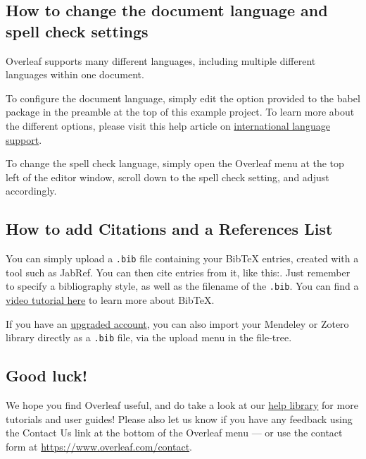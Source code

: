 \subsection{How to change the document language and spell check settings}

Overleaf supports many different languages, including multiple different languages within one document. 

To configure the document language, simply edit the option provided to the babel package in the preamble at the top of this example project. To learn more about the different options, please visit this help article on \href{https://www.overleaf.com/learn/latex/International_language_support}{international language support}.

To change the spell check language, simply open the Overleaf menu at the top left of the editor window, scroll down to the spell check setting, and adjust accordingly.

\subsection{How to add Citations and a References List}

You can simply upload a \verb|.bib| file containing your BibTeX entries, created with a tool such as JabRef. You can then cite entries from it, like this:\cite{greenwade93}. Just remember to specify a bibliography style, as well as the filename of the \verb|.bib|. You can find a \href{https://www.overleaf.com/help/97-how-to-include-a-bibliography-using-bibtex}{video tutorial here} to learn more about BibTeX.

If you have an \href{https://www.overleaf.com/user/subscription/plans}{upgraded account}, you can also import your Mendeley or Zotero library directly as a \verb|.bib| file, via the upload menu in the file-tree.

\subsection{Good luck!}

We hope you find Overleaf useful, and do take a look at our \href{https://www.overleaf.com/learn}{help library} for more tutorials and user guides! Please also let us know if you have any feedback using the Contact Us link at the bottom of the Overleaf menu --- or use the contact form at \url{https://www.overleaf.com/contact}.